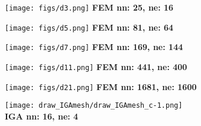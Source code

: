 \documentclass{article}
\begin{document}
\begin{center}
  \begin{minipage}{0.31\linewidth}
    \centering
    \texttt{[image: figs/d3.png]}
    {\scriptsize \textbf{FEM nn: 25, ne: 16}}
  \end{minipage}
  \begin{minipage}{0.31\linewidth}
    \centering
    \texttt{[image: figs/d5.png]}
    {\scriptsize \textbf{FEM nn: 81, ne: 64}}
  \end{minipage}
  \begin{minipage}{0.31\linewidth}
    \centering
    \texttt{[image: figs/d7.png]}
    {\scriptsize \textbf{FEM nn: 169, ne: 144}}
  \end{minipage}
  \begin{minipage}{0.31\linewidth}
    \centering
    \texttt{[image: figs/d11.png]}
    {\scriptsize \textbf{FEM nn: 441, ne: 400}}
  \end{minipage}
  \begin{minipage}{0.31\linewidth}
    \centering
    \texttt{[image: figs/d21.png]}
    {\scriptsize \textbf{FEM nn: 1681, ne: 1600}}
  \end{minipage}
  \begin{minipage}{0.31\linewidth}
    \centering
    \texttt{[image: draw\_IGAmesh/draw\_IGAmesh\_c-1.png]} \\
    \vspace{-3mm}
    {\scriptsize \textbf{IGA nn: 16, ne: 4}}
  \end{minipage}
\end{center}
\end{document}

